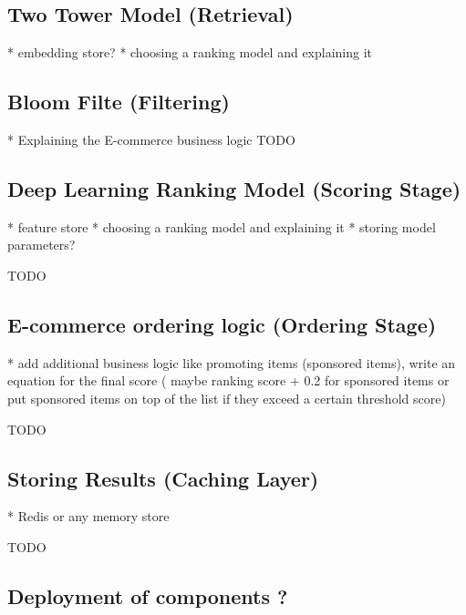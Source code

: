\subsection{Two Tower Model (Retrieval)}
* embedding store?
* choosing a ranking model and explaining it

\subsection{Bloom Filte (Filtering)}
* Explaining the E-commerce business logic
TODO 



\subsection{Deep Learning Ranking Model (Scoring Stage)}

* feature store 
* choosing a ranking model and explaining it
* storing model parameters?


TODO

\subsection{E-commerce ordering logic (Ordering Stage)}

* add additional business logic like promoting items (sponsored items), write an equation for the final score ( maybe ranking score + 0.2 for sponsored items or put sponsored items on top of the list if they exceed a certain threshold score)

TODO

\subsection{Storing Results (Caching Layer)}

* Redis or any memory store

TODO

\subsection{Deployment of components ?}
